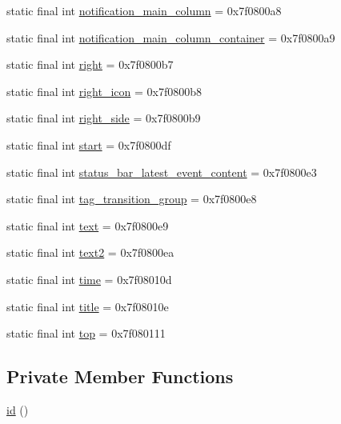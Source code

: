 \begin{DoxyCompactItemize}
static final int \mbox{\hyperlink{classandroid_1_1support_1_1v4_1_1_r_1_1id_ae504c70319d65564dd72127fddbeb0cf}{notification\+\_\+main\+\_\+column}} = 0x7f0800a8
\item 
static final int \mbox{\hyperlink{classandroid_1_1support_1_1v4_1_1_r_1_1id_a42b01419a5d5217de6c59e071e4bf055}{notification\+\_\+main\+\_\+column\+\_\+container}} = 0x7f0800a9
\item 
static final int \mbox{\hyperlink{classandroid_1_1support_1_1v4_1_1_r_1_1id_aa818423e6c0d8ea8151a94140abed4eb}{right}} = 0x7f0800b7
\item 
static final int \mbox{\hyperlink{classandroid_1_1support_1_1v4_1_1_r_1_1id_a00af98f22d1daea214d4bec44f26f5a0}{right\+\_\+icon}} = 0x7f0800b8
\item 
static final int \mbox{\hyperlink{classandroid_1_1support_1_1v4_1_1_r_1_1id_a8b25f7661ddb3333d9c1c0e566ff6116}{right\+\_\+side}} = 0x7f0800b9
\item 
static final int \mbox{\hyperlink{classandroid_1_1support_1_1v4_1_1_r_1_1id_a246c24fae5521e160e9306817a2bd3b1}{start}} = 0x7f0800df
\item 
static final int \mbox{\hyperlink{classandroid_1_1support_1_1v4_1_1_r_1_1id_a229fca951cbfa57fc3abda27dc9de03a}{status\+\_\+bar\+\_\+latest\+\_\+event\+\_\+content}} = 0x7f0800e3
\item 
static final int \mbox{\hyperlink{classandroid_1_1support_1_1v4_1_1_r_1_1id_a117507d5d581a27ed95fe9d5537d6630}{tag\+\_\+transition\+\_\+group}} = 0x7f0800e8
\item 
static final int \mbox{\hyperlink{classandroid_1_1support_1_1v4_1_1_r_1_1id_a9849f260d54f8bed2873f6421aee7723}{text}} = 0x7f0800e9
\item 
static final int \mbox{\hyperlink{classandroid_1_1support_1_1v4_1_1_r_1_1id_aa02a7ff3fa383b21c5b845b18852ac3b}{text2}} = 0x7f0800ea
\item 
static final int \mbox{\hyperlink{classandroid_1_1support_1_1v4_1_1_r_1_1id_a30afcc3dcdbb2cea555117ae116b61a1}{time}} = 0x7f08010d
\item 
static final int \mbox{\hyperlink{classandroid_1_1support_1_1v4_1_1_r_1_1id_a5c8aede2950c8a3ade737063d752bbda}{title}} = 0x7f08010e
\item 
static final int \mbox{\hyperlink{classandroid_1_1support_1_1v4_1_1_r_1_1id_ac07fa206015ccb5a5bb0da6bbe642bc1}{top}} = 0x7f080111
\end{DoxyCompactItemize}
\subsection*{Private Member Functions}
\begin{DoxyCompactItemize}
\item 
\mbox{\hyperlink{classandroid_1_1support_1_1v4_1_1_r_1_1id_a41674462355e6ba38d31dbbabe96adc1}{id}} ()
\end{DoxyCompactItemize}


